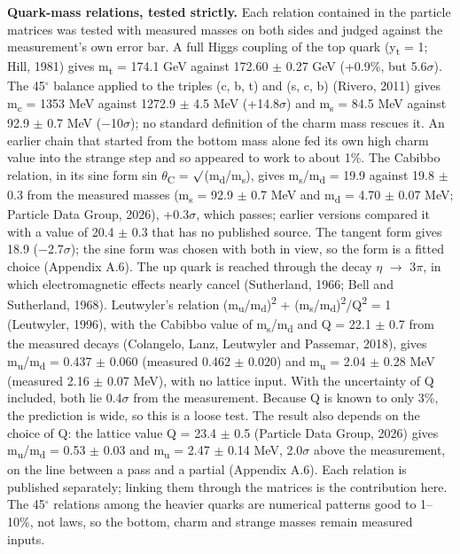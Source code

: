 \documentclass[
  11pt,
]{article}
\begin{document}
\textbf{Quark-mass relations, tested strictly.} Each relation contained in the particle matrices was tested with measured masses on both sides and judged against the measurement's own error bar. A full Higgs coupling of the top quark (y\textsubscript{t} = 1; Hill, 1981) gives m\textsubscript{t} = 174.1 GeV against 172.60 \ensuremath{\pm} 0.27 GeV (+0.9\%, but 5.6\ensuremath{\sigma}). The 45\ensuremath{^\circ} balance applied to the triples (c, b, t) and (s, c, b) (Rivero, 2011) gives m\textsubscript{c} = 1353 MeV against 1272.9 \ensuremath{\pm} 4.5 MeV (+14.8\ensuremath{\sigma}) and m\textsubscript{s} = 84.5 MeV against 92.9 \ensuremath{\pm} 0.7 MeV (\ensuremath{-}10\ensuremath{\sigma}); no standard definition of the charm mass rescues it. An earlier chain that started from the bottom mass alone fed its own high charm value into the strange step and so appeared to work to about 1\%. The Cabibbo relation, in its sine form sin \ensuremath{\theta}\textsubscript{C} = \ensuremath{\surd}(m\textsubscript{d}/m\textsubscript{s}), gives m\textsubscript{s}/m\textsubscript{d} = 19.9 against 19.8 \ensuremath{\pm} 0.3 from the measured masses (m\textsubscript{s} = 92.9 \ensuremath{\pm} 0.7 MeV and m\textsubscript{d} = 4.70 \ensuremath{\pm} 0.07 MeV; Particle Data Group, 2026), +0.3\ensuremath{\sigma}, which passes; earlier versions compared it with a value of 20.4 \ensuremath{\pm} 0.3 that has no published source. The tangent form gives 18.9 (\ensuremath{-}2.7\ensuremath{\sigma}); the sine form was chosen with both in view, so the form is a fitted choice (Appendix A.6). The up quark is reached through the decay \ensuremath{\eta} \ensuremath{\to} 3\ensuremath{\pi}, in which electromagnetic effects nearly cancel (Sutherland, 1966; Bell and Sutherland, 1968). Leutwyler's relation (m\textsubscript{u}/m\textsubscript{d})\textsuperscript{2} + (m\textsubscript{s}/m\textsubscript{d})\textsuperscript{2}/Q\textsuperscript{2} = 1 (Leutwyler, 1996), with the Cabibbo value of m\textsubscript{s}/m\textsubscript{d} and Q = 22.1 \ensuremath{\pm} 0.7 from the measured decays (Colangelo, Lanz, Leutwyler and Passemar, 2018), gives m\textsubscript{u}/m\textsubscript{d} = 0.437 \ensuremath{\pm} 0.060 (measured 0.462 \ensuremath{\pm} 0.020) and m\textsubscript{u} = 2.04 \ensuremath{\pm} 0.28 MeV (measured 2.16 \ensuremath{\pm} 0.07 MeV), with no lattice input. With the uncertainty of Q included, both lie 0.4\ensuremath{\sigma} from the measurement. Because Q is known to only 3\%, the prediction is wide, so this is a loose test. The result also depends on the choice of Q: the lattice value Q = 23.4 \ensuremath{\pm} 0.5 (Particle Data Group, 2026) gives m\textsubscript{u}/m\textsubscript{d} = 0.53 \ensuremath{\pm} 0.03 and m\textsubscript{u} = 2.47 \ensuremath{\pm} 0.14 MeV, 2.0\ensuremath{\sigma} above the measurement, on the line between a pass and a partial (Appendix A.6). Each relation is published separately; linking them through the matrices is the contribution here. The 45\ensuremath{^\circ} relations among the heavier quarks are numerical patterns good to 1--10\%, not laws, so the bottom, charm and strange masses remain measured inputs.
\end{document}
